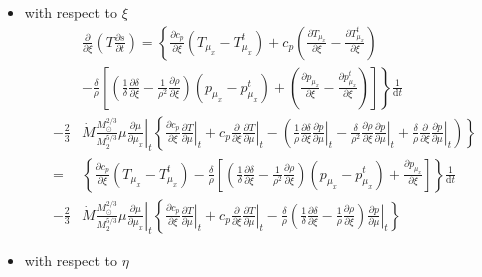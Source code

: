 \documentclass[12pt,a4paper]{article}
\newcommand{\pfird}[2][]{\frac{\partial#1}{\partial#2}}
\newcommand{\dd}[1]{\mathrm{d}#1}
\begin{document}
\begin{itemize}
  \item with respect to $\xi$
  \begin{align}
    &\pfird[]{\xi}\left(T\pfird[s]{t}\right) = \left\{\pfird[c_p]{\xi}\left(T_{\mu_x} - T_{\mu_x}^t\right) + c_p\left(\pfird[T_{\mu_x}]{\xi} - \pfird[T_{\mu_x}^t]{\xi}\right)\right.\nonumber\\
    &\left.- \frac{\delta}{\rho}\left[\left(\frac{1}{\delta}\pfird[\delta]{\xi} - \frac{1}{\rho^2}\pfird[\rho]{\xi}\right)\left(p_{\mu_x} - p_{\mu_x}^t\right)  + \left(\pfird[p_{\mu_x}]{\xi} - \pfird[p_{\mu_x}^t]{\xi}\right)\right]\right\}\frac{1}{\dd{t}}\nonumber\\
    -\frac{2}{3}&\dot{M}\frac{M_\odot^{2/3}}{M_2^{5/3}}\mu\left.\pfird[\mu]{\mu_x}\right|_t\left\{\pfird[c_p]{\xi}\left.\pfird[T]{\mu}\right|_t + c_p\pfird[]{\xi}\left.\pfird[T]{\mu}\right|_t - \left(\frac{1}{\rho}\pfird[\delta]{\xi}\left.\pfird[p]{\mu}\right|_t - \frac{\delta}{\rho^2}\pfird[\rho]{\xi}\left.\pfird[p]{\mu}\right|_t + \frac{\delta}{\rho}\pfird[]{\xi}\left.\pfird[p]{\mu}\right|_t\right)\right\}\nonumber\\
    =&\left\{\pfird[c_p]{\xi}\left(T_{\mu_x} - T_{\mu_x}^t\right) - \frac{\delta}{\rho}\left[\left(\frac{1}{\delta}\pfird[\delta]{\xi} - \frac{1}{\rho^2}\pfird[\rho]{\xi}\right)\left(p_{\mu_x} - p_{\mu_x}^t\right)  +\pfird[p_{\mu_x}]{\xi}\right]\right\}\frac{1}{\dd{t}}\nonumber\\
    -\frac{2}{3}&\dot{M}\frac{M_\odot^{2/3}}{M_2^{5/3}}\mu\left.\pfird[\mu]{\mu_x}\right|_t\left\{\pfird[c_p]{\xi}\left.\pfird[T]{\mu}\right|_t + c_p\pfird[]{\xi}\left.\pfird[T]{\mu}\right|_t - \frac{\delta}{\rho}\left(\frac{1}{\delta}\pfird[\delta]{\xi} - \frac{1}{\rho}\pfird[\rho]{\xi}\right)\left.\pfird[p]{\mu}\right|_t\right\}
  \end{align}

  \item with respect to $\eta$


\end{itemize}
\end{document}
